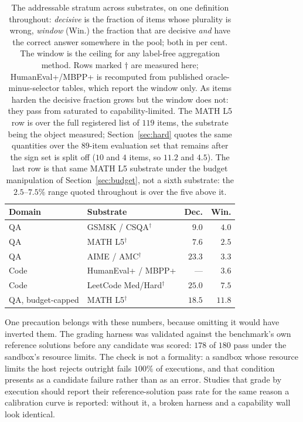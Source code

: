 \documentclass[twoside,11pt]{article}
\begin{document}
\begin{table}[t]
\caption{The addressable stratum across substrates, on one definition
throughout: \emph{decisive} is the fraction of items whose plurality is wrong,
\emph{window} (Win.) the fraction that are decisive \emph{and} have the
correct answer somewhere in the pool; both in per cent. The window is the ceiling for any label-free
aggregation method. Rows marked $\dagger$ are measured here; HumanEval+/MBPP+
is recomputed from published oracle-minus-selector tables, which report the
window only. As items harden the decisive fraction grows but the window does
not: they pass from saturated to capability-limited. The MATH L5 row is over
the full registered list of $119$ items, the substrate being the object
measured; Section~\ref{sec:hard} quotes the same quantities over the $89$-item
evaluation set that remains after the sign set is split off ($10$ and $4$
items, so $11.2$ and $4.5$). The last row is that same MATH L5 substrate
under the budget manipulation of Section~\ref{sec:budget}, not a sixth
substrate: the $2.5$--$7.5\%$ range quoted throughout is over the five
above it.}
\label{tab:window}
\centering\footnotesize
\setlength{\tabcolsep}{4pt}
\setlength{\tabcolsep}{3pt}
\begin{tabular}{@{}l l r r@{}}
\toprule
Domain & Substrate & Dec. & Win. \\
\midrule
QA & GSM8K / CSQA$^\dagger$ & $9.0$ & $4.0$ \\
QA & MATH L5$^\dagger$ & $7.6$ & $2.5$ \\
QA & AIME / AMC$^\dagger$ & $23.3$ & $3.3$ \\
Code & HumanEval+ / MBPP+ & --- & $3.6$ \\
Code & LeetCode Med/Hard$^\dagger$ & $25.0$ & $7.5$ \\
QA, budget-capped & MATH L5$^\dagger$ & $18.5$ & $11.8$ \\
\bottomrule
\end{tabular}
\end{table}

One precaution belongs with these numbers, because omitting it would have
inverted them. The grading harness was validated against the benchmark's own
reference solutions before any candidate was scored: $178$ of $180$ pass
under the sandbox's resource limits. The check is not a formality: a sandbox whose
resource limits the host rejects outright fails $100\%$ of executions, and
that condition presents as a candidate failure rather than as an error. Studies that grade by execution should report their
reference-solution pass rate for the same reason a calibration curve is
reported: without it, a broken harness and a capability wall look identical.
\end{document}
